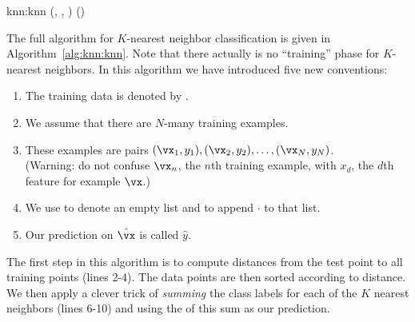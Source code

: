 
\newalgorithm%
  {knn:knn}%
  {(, , \VAR{$\hat\vx$})}
  {
 
\ENDFOR
{} 
 
 
\ENDFOR
\RETURN {}() 
}

The full algorithm for $K$-nearest neighbor classification is given in
Algorithm~\ref{alg:knn:knn}.  Note that there actually is no
``training'' phase for $K$-nearest neighbors.  In this algorithm we
have introduced five new conventions:

\begin{enumerate}
\item The training data is denoted by .
\item We assume that there are $N$-many training examples.
\item These examples are pairs $(\vx_1,y_1), (\vx_2,y_2), \dots,
  (\vx_N,y_N)$.\\(Warning: do not confuse $\vx_n$, the $n$th training
  example, with $x_d$, the $d$th feature for example $\vx$.)
\item We use \emptylist to denote an empty list and \pushlist{$\cdot$}
  to append $\cdot$ to that list.
\item Our prediction on $\hat\vx$ is called $\hat y$.
\end{enumerate}

The first step in this algorithm is to compute distances from the test
point to all training points (lines 2-4).  The data points are then
sorted according to distance.  We then apply a clever trick of
\emph{summing} the class labels for each of the $K$ nearest neighbors
(lines 6-10) and using the  of this sum as our prediction.


